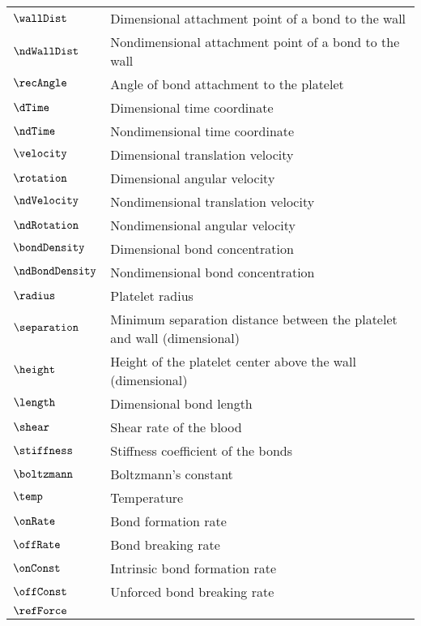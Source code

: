 
\begin{tabular}{ll}
  \toprule
  $\wallDist$ & Dimensional attachment point of a bond to the wall\\
  $\ndWallDist$ & Nondimensional attachment point of a bond to the wall\\
  $\recAngle$ & Angle of bond attachment to the platelet\\
  $\dTime$ & Dimensional time coordinate \\
  $\ndTime$ & Nondimensional time coordinate\\
  $\velocity$ & Dimensional translation velocity \\
  $\rotation$ & Dimensional angular velocity \\
  $\ndVelocity$ & Nondimensional translation velocity \\
  $\ndRotation$ & Nondimensional angular velocity \\
  $\bondDensity$ & Dimensional bond concentration \\
  $\ndBondDensity$ & Nondimensional bond concentration \\
  $\radius$ & Platelet radius \\
  $\separation$ & Minimum separation distance between the platelet and
                  wall (dimensional)\\
  $\height$ & Height of the platelet center above the wall
              (dimensional) \\
  $\length$ & Dimensional bond length \\
  $\shear$ & Shear rate of the blood \\
  $\stiffness$ & Stiffness coefficient of the bonds \\
  $\boltzmann$ & Boltzmann's constant \\
  $\temp$ & Temperature \\
  $\onRate$ & Bond formation rate \\
  $\offRate$ & Bond breaking rate \\
  $\onConst$ & Intrinsic bond formation rate \\
  $\offConst$ & Unforced bond breaking rate \\
  $\refForce$ & \\

\end{tabular}
